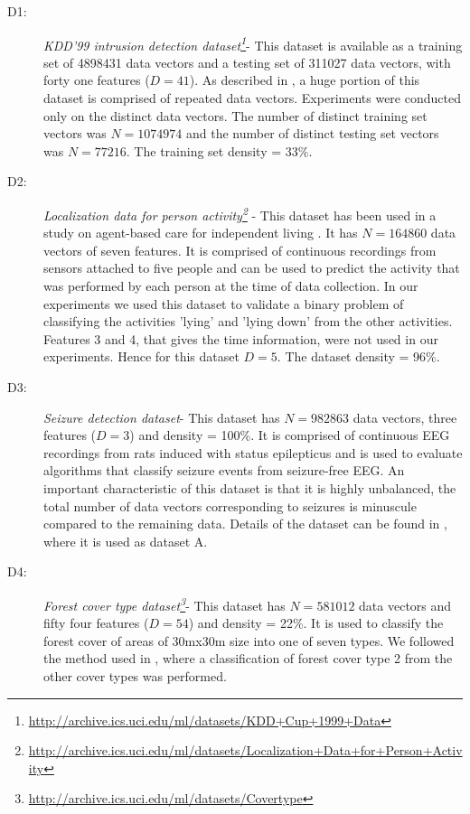\documentclass[twoside]{article}
\begin{document}
\begin{description}
\item[D1: ]{\it KDD'99 intrusion detection dataset\footnote{\url{http://archive.ics.uci.edu/ml/datasets/KDD+Cup+1999+Data}}}- This dataset is available as a training set of 4898431 data vectors and a testing set of 311027 data vectors, with forty one features ($D = 41$). As described in \citet{Tavallaee09}, a huge portion of this dataset is comprised of repeated data vectors. Experiments were conducted only on the distinct data vectors. The number of distinct training set vectors was $N = 1074974$ and the number of distinct testing set vectors was $N = 77216$. The training set density = 33\%.

\item[D2: ]{\it Localization data for person activity\footnote{\url{http://archive.ics.uci.edu/ml/datasets/Localization+Data+for+Person+Activity}} }- This dataset has been used in a study on agent-based care for independent living \citep{Kaluza10}. It has $N = 164860$ data vectors of seven features. It is comprised of continuous recordings from sensors attached to five people and can be used to predict the activity that was performed by each person at the time of data collection. In our experiments we used this dataset to validate a binary problem of classifying the activities 'lying' and 'lying down' from the other activities. Features 3 and 4, that gives the time information, were not used in our experiments. Hence for this dataset $D = 5$. The dataset density = 96\%.

\item[D3: ]{\it  Seizure detection dataset}- This dataset has $N = 982863$ data vectors, three features ($D = 3$) and density = 100\%. It is comprised of continuous EEG recordings from rats induced with status epilepticus and is used to evaluate algorithms that classify seizure events from seizure-free EEG. An important characteristic of this dataset is that it is highly unbalanced, the total number of data vectors corresponding to seizures is minuscule compared to the remaining data. Details of the dataset can be found in \citet{Nandan10}, where it is used as dataset A.

\item[D4: ]{\it Forest cover type dataset\footnote{\url{http://archive.ics.uci.edu/ml/datasets/Covertype}}}- This dataset has $N = 581012$ data vectors and fifty four features ($D = 54$) and density = 22\%. It is used to classify the forest cover of areas of 30mx30m size into one of seven types. We followed the method used in \citet{Collobert02}, where a classification of forest cover type 2 from the other cover types was performed.


\end{description}
\end{document}

